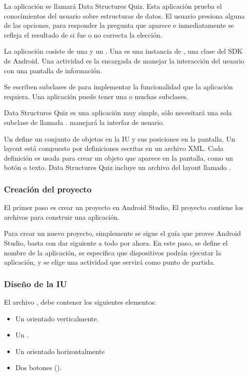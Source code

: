 La aplicación se llamará Data Structures Quiz. Esta aplicación prueba el
conocimientos del usuario sobre estructuras de datos. El usuario presiona
alguna de las opciones, para responder la pregunta que aparece e inmediatamente
se refleja el resultado de si fue o no correcta la elección.

La aplicación cosiste de una  y un .
Una  es una instancia de , una clase del SDK de Android.
Una actividad es la encargada de manejar la interacción del usuario con una
pantalla de información.

Se escriben subclases de  para implementar la funcionalidad que la
aplicación requiera. Una aplicación puede tener una o muchas subclases.

Data Structures Quiz es una aplicación muy simple, sólo necesitará una sola
subclase de  llamada .  manejará la
interfaz de usuario.

Un  define un conjunto de objetos en la IU y sus posiciones en la
pantalla. Un layout está compuesto por definiciones escritas en un archivo
XML. Cada definición es usada para crear un objeto que aparece en la pantalla,
como un botón o texto.
Data Structures Quiz incluye un archivo del layout llamado .


\subsubsection{Creación del proyecto}
\label{\detokenize{dev_docs:creacion-del-proyecto}}
El primer paso es crear un proyecto en Android Studio, El proyecto contiene
los archivos para construir una aplicación.

Para crear un nuevo proyecto, simplemente se sigue el guía que provee Android
Studio, basta con dar siguiente a todo por ahora.
En este paso, se define el nombre
de la aplicación, se especifica que dispositivos podrán ejecutar la aplicación,
y se elige una actividad que servirá como punto de partida.

\subsubsection{Diseño de la IU}
\label{\detokenize{dev_docs:diseno-de-la-iu}}
El archivo , debe contener los siguientes elementos:
\begin{itemize}
\item {} 
Un  orientado verticalmente.

\item {} 
Un .

\item {} 
Un  orientado horizontalmente

\item {} 
Dos botones ().

\end{itemize}

